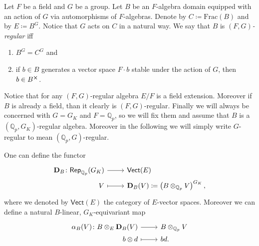 

\begin{defn}
	Let $F$ be a field and $G$ be a group.
	Let $B$ be an $F$-algebra domain
	equipped with an action of $G$ via automorphisms of $F$-algebras.
	Denote by $C \coloneqq \mathrm{Frac}(B)$ and by $E \coloneqq B^{G}$.
	Notice that $G$ acts on $C$ in a natural way.
	We say that $B$ is {\em $(F,G)$-regular} iff
\begin{enumerate}
	\item $B^{G} = C^{G}$ and
	\item if $b \in B$ generates a vector space $F \cdot b$
		stable under the action of $G$, then $b \in B^{\cross}$.
\end{enumerate}
\end{defn}


\begin{rem}[]
	Notice that for any $(F,G)$-regular algebra $E/F$ is a field extension.
	Moreover if $B$ is already a field, than it clearly is $(F,G)$-regular.
	Finally we will always be concerned with $G = G_K$ and $F = \mathbb{Q}_p$,
	so we will fix them and assume that $B$ is a $(\mathbb{Q}_p, G_K)$-regular
	algebra.
	Moreover in the following we will simply write 
	$G$-regular to mean $(\mathbb{Q}_p, G)$-regular.
\end{rem}


\begin{defn}[]
	One can define the functor
	\begin{equation*}
	\begin{tikzcd}[row sep = 0ex
		,/tikz/column 1/.append style={anchor=base east}
		,/tikz/column 2/.append style={anchor=base west}]
		\mathbf{D}_B\colon \mathsf{Rep}_{\mathbb{Q}_p}(G_K) \arrow[r, "", rightarrow] &
		\mathsf{Vect}(E) \\
		V \arrow[r, "", mapsto] & 
		\mathbf{D}_B(V) \coloneqq \left( B \otimes_{\mathbb{Q}_p} V \right)^{G_K}
	,\end{tikzcd}
	\end{equation*} 
	where we denoted by $\mathsf{Vect}(E)$ the category of $E$-vector spaces.
	Moreover we can define a natural $B$-linear, $G_K$-equivariant map
	\begin{equation*}
	\begin{tikzcd}[row sep = 0ex
		,/tikz/column 1/.append style={anchor=base east}
		,/tikz/column 2/.append style={anchor=base west}]
		\alpha_B(V)\colon 
		B \otimes_E \mathbf{D}_B(V) \arrow[r, "", rightarrow] &
		B \otimes_{\mathbb{Q}_p} V \\
		b \otimes d
		\arrow[r, "", mapsto] & 
		bd
	.\end{tikzcd}
	\end{equation*}
\end{defn}


